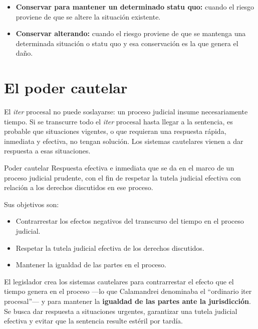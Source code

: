 \documentclass[12pt,oneside]{book}
\begin{document}
\begin{itemize}
    \item \textbf{Conservar para mantener un determinado statu quo:} cuando el riesgo proviene de que se altere la situación existente.
    \item \textbf{Conservar alterando:} cuando el riesgo proviene de que se mantenga una determinada situación o statu quo y esa conservación es la que genera el daño.
\end{itemize}

\section{El poder cautelar}

El \textit{iter} procesal no puede soslayarse: un proceso judicial insume necesariamente tiempo. Si se transcurre todo el \textit{iter} procesal hasta llegar a la sentencia, es probable que situaciones vigentes, o que requieran una respuesta rápida, inmediata y efectiva, no tengan solución. Los sistemas cautelares vienen a dar respuesta a esas situaciones.

\begin{definition}{Poder cautelar}
Respuesta efectiva e inmediata que se da en el marco de un proceso judicial prudente, con el fin de respetar la tutela judicial efectiva con relación a los derechos discutidos en ese proceso.
\end{definition}

Sus objetivos son:

\begin{itemize}
    \item Contrarrestar los efectos negativos del transcurso del tiempo en el proceso judicial.
    \item Respetar la tutela judicial efectiva de los derechos discutidos.
    \item Mantener la igualdad de las partes en el proceso.
\end{itemize}

\begin{important}
El legislador crea los sistemas cautelares para contrarrestar el efecto que el tiempo genera en el proceso ---lo que Calamandrei denominaba el ``ordinario iter procesal''--- y para mantener la \textbf{igualdad de las partes ante la jurisdicción}. Se busca dar respuesta a situaciones urgentes, garantizar una tutela judicial efectiva y evitar que la sentencia resulte estéril por tardía.
\end{important}
\end{document}
